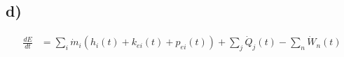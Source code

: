 

\subsection*{d)}
\begin{align*}
\frac{dE}{dt} & = \sum_i \dot{m}_i (h_i(t) + k_{ei}(t) + p_{ei}(t)) + \sum_j \dot{Q}_j(t) - \sum_n \dot{W}_n(t)
\end{align*}